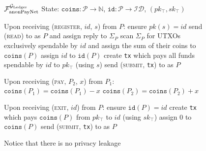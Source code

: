 \begin{figure}[H]
  \begin{systembox}{$\mathcal{F}_{\mathrm{anonPayNet}}^{\mathcal{G}_{\mathrm{Ledger}}}$}
    State: $\mathtt{coins} : \mathcal{P} \rightarrow \mathbb{N}$,
    $\mathtt{id} : \mathcal{P} \rightarrow \mathcal{ID}$, $(pk_{\top},
    sk_{\top})$
    \begin{algorithmic}[1]
      \State Upon receiving (\textsc{register}, $id$, $s$) from $P$:
      \Indent
        \State ensure $pk(s) = id$
        \State send (\textsc{read}) to \ledger as $P$ and assign reply to
        $\Sigma_P$
        \State scan $\Sigma_P$ for UTXOs exclusively spendable by $id$ and
        assign the sum of their coins to $\mathtt{coins}(P)$
        \State assign $id$ to $\mathtt{id}(P)$
        \State create \texttt{tx} which pays all funds spendable by $id$ to
        $pk_{\top}$ (using $s$)
        \State send (\textsc{submit}, \texttt{tx}) to \ledger as $P$
      \EndIndent
      \Statex

      \State Upon receiving (\textsc{pay}, $P_2$, $x$) from $P_1$:
      \Indent
          \State $\mathtt{coins}(P_1) = \mathtt{coins}(P_1) - x$
          \State $\mathtt{coins}(P_2) = \mathtt{coins}(P_2) + x$
        \EndIf
      \EndIndent
      \Statex

      \State Upon receiving (\textsc{exit}, $id$) from $P$:
      \Indent
        \State ensure $\mathtt{id}(P) = id$
        \State create \texttt{tx} which pays $\mathtt{coins}(P)$ from
        $pk_{\top}$ to $id$ (using $sk_{\top}$)
        \State assign $0$ to $\mathtt{coins}(P)$
        \State send (\textsc{submit}, \texttt{tx}) to \ledger as $P$
      \EndIndent
    \end{algorithmic}
  \end{systembox}
  \caption{Notice that there is no privacy leakage}
  \label{alg:anon-pay-func}
\end{figure}
